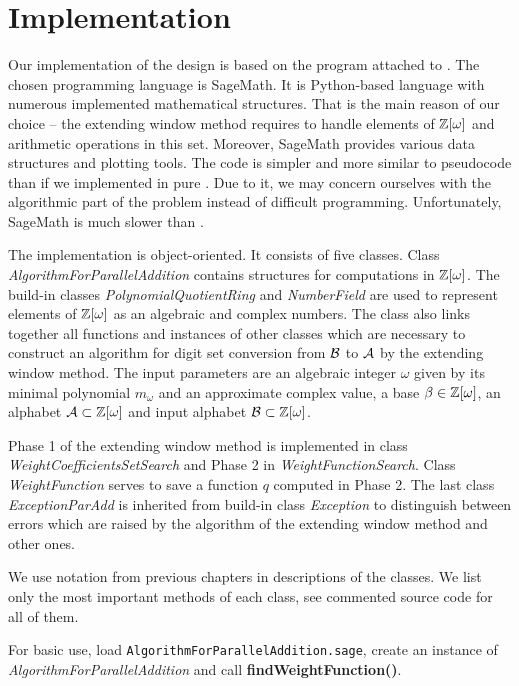 \section{Implementation}

Our implementation of the design is based on the program attached to \cite{vu}. The chosen programming language is SageMath. It is Python-based language with numerous implemented mathematical structures. That is the main reason of our choice -- the extending window method requires to handle elements of $\mathbb{Z}[\omega]$ and arithmetic operations in this set. Moreover, SageMath provides various data structures and plotting tools.  The code is simpler and more similar to pseudocode than if we implemented in pure \Cpp. Due to it, we may concern ourselves with the algorithmic part of the problem instead of difficult programming. Unfortunately, SageMath is much slower than \Cpp.


The implementation is object-oriented. It consists of five classes. Class \emph{AlgorithmForParallelAddition} contains structures for computations in $\mathbb{Z}[\omega]$. The build-in classes \emph{PolynomialQuotientRing} and \emph{NumberField} are used to represent elements of $\mathbb{Z}[\omega]$ as an algebraic and complex numbers. The class also links together all functions and instances of other classes which are necessary to construct an algorithm for digit set conversion from $\mathcal{B}$ to $\mathcal{A}$ by the extending window method. The input parameters are an algebraic integer $\omega$ given by its minimal polynomial $m_\omega$ and an approximate complex value, a base $\beta\in\mathbb{Z}[\omega]$, an alphabet $\mathcal{A}\subset\mathbb{Z}[\omega]$ and input alphabet $\mathcal{B}\subset\mathbb{Z}[\omega]$. 

Phase 1 of the extending window method is implemented in class \emph{WeightCoefficientsSetSearch} and Phase 2 in \emph{WeightFunctionSearch}. Class \emph{WeightFunction} serves to save a function $q$ computed in Phase 2. The last class \emph{ExceptionParAdd} is inherited from build-in class \emph{Exception} to distinguish between errors which are raised by the algorithm  of the extending window method and other ones.

We use notation from previous chapters in descriptions of the classes. We list only the most important methods of each class, see commented source code for all of them.  

For basic use, load \verb+AlgorithmForParallelAddition.sage+, create an instance of \emph{AlgorithmForParallelAddition} and call \textbf{findWeightFunction()}.

